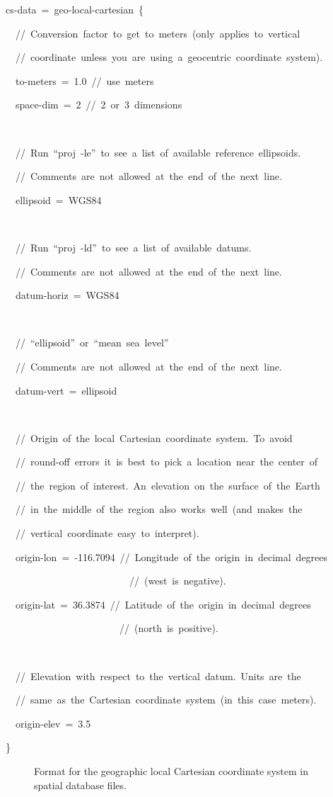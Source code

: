 \begin{lyxcode}
cs-data~=~geo-local-cartesian~\{

~~//~Conversion~factor~to~get~to~meters~(only~applies~to~vertical

~~//~coordinate~unless~you~are~using~a~geocentric~coordinate~system).

~~to-meters~=~1.0~//~use~meters

~~space-dim~=~2~//~2~or~3~dimensions

~

~~//~Run~``proj~-le''~to~see~a~list~of~available~reference~ellipsoids.

~~//~Comments~are~not~allowed~at~the~end~of~the~next~line.

~~ellipsoid~=~WGS84

~

~~//~Run~``proj~-ld''~to~see~a~list~of~available~datums.

~~//~Comments~are~not~allowed~at~the~end~of~the~next~line.

~~datum-horiz~=~WGS84

~

~~//~``ellipsoid''~or~``mean~sea~level''

~~//~Comments~are~not~allowed~at~the~end~of~the~next~line.

~~datum-vert~=~ellipsoid

~

~~//~Origin~of~the~local~Cartesian~coordinate~system.~To~avoid

~~//~round-off~errors~it~is~best~to~pick~a~location~near~the~center~of

~~//~the~region~of~interest.~An~elevation~on~the~surface~of~the~Earth

~~//~in~the~middle~of~the~region~also~works~well~(and~makes~the

~~//~vertical~coordinate~easy~to~interpret).

~~origin-lon~=~-116.7094~//~Longitude~of~the~origin~in~decimal~degrees

~~~~~~~~~~~~~~~~~~~~~~~~~//~(west~is~negative).

~~origin-lat~=~36.3874~//~Latitude~of~the~origin~in~decimal~degrees~

~~~~~~~~~~~~~~~~~~~~~~~//~(north~is~positive).

~

~~//~Elevation~with~respect~to~the~vertical~datum.~Units~are~the

~~//~same~as~the~Cartesian~coordinate~system~(in~this~case~meters).

~~origin-elev~=~3.5

\}
\end{lyxcode}
\begin{figure}[H]
\caption{Format for the geographic local Cartesian coordinate system in spatial
database files.}
\end{figure}



